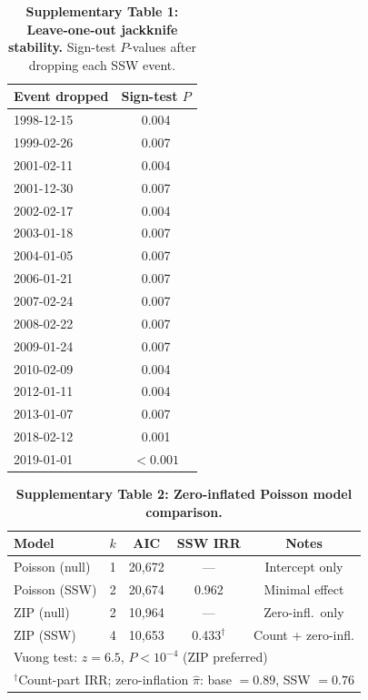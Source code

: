 \documentclass[11pt,letterpaper]{article}
\begin{document}
\begin{table}[!ht]
\centering
\caption{\textbf{Supplementary Table 1: Leave-one-out jackknife stability.}
Sign-test $P$-values after dropping each SSW event.}
\label{stab:loo}
\small
\begin{tabular}{lc}
\toprule
Event dropped & Sign-test $P$ \\
\midrule
1998-12-15 & 0.004 \\
1999-02-26 & 0.007 \\
2001-02-11 & 0.004 \\
2001-12-30 & 0.007 \\
2002-02-17 & 0.004 \\
2003-01-18 & 0.007 \\
2004-01-05 & 0.007 \\
2006-01-21 & 0.007 \\
2007-02-24 & 0.007 \\
2008-02-22 & 0.007 \\
2009-01-24 & 0.007 \\
2010-02-09 & 0.004 \\
2012-01-11 & 0.004 \\
2013-01-07 & 0.007 \\
2018-02-12 & 0.001 \\
2019-01-01 & $< 0.001$ \\
\bottomrule
\end{tabular}
\end{table}

\begin{table}[!ht]
\centering
\caption{\textbf{Supplementary Table 2: Zero-inflated Poisson model comparison.}}
\label{stab:zip}
\small
\begin{tabular}{lcccc}
\toprule
Model & $k$ & AIC & SSW IRR & Notes \\
\midrule
Poisson (null) & 1 & 20{,}672 & --- & Intercept only \\
Poisson (SSW) & 2 & 20{,}674 & 0.962 & Minimal effect \\
ZIP (null) & 2 & 10{,}964 & --- & Zero-infl.\ only \\
ZIP (SSW) & 4 & 10{,}653 & 0.433$^\dagger$ & Count + zero-infl. \\
\midrule
\multicolumn{5}{l}{Vuong test: $z = 6.5$, $P < 10^{-4}$ (ZIP preferred)} \\
\multicolumn{5}{l}{$^\dagger$Count-part IRR; zero-inflation $\hat{\pi}$: base $= 0.89$, SSW $= 0.76$} \\
\bottomrule
\end{tabular}
\end{table}
\end{document}
